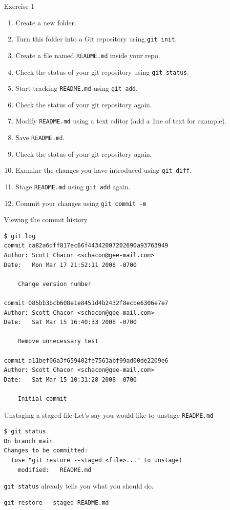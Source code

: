 \documentclass[handout]{beamer}
\begin{document}
\begin{frame}{Exercise 1}
	\begin{enumerate}
		\item Create a new folder.
		\item Turn this folder into a Git repository using \texttt{git init}.
		\item Create a file named \texttt{README.md} inside your repo.
		\item Check the status of your git repository using \texttt{git status}.
		\item Start tracking \texttt{README.md} using \texttt{git add}.
		\item Check the status of your git repository again.
		\item Modify \texttt{README.md} using a text editor (add a line of text for example).
		\item Save \texttt{README.md}.
		\item Check the status of your git repository again.
		\item Examine the changes you have introduced using \texttt{git diff}.
		\item Stage \texttt{README.md} using \texttt{git add} again. 
		\item Commit your changes using \texttt{git commit -m}
	\end{enumerate}
\end{frame}

\begin{frame}[fragile]{Viewing the commit history}
\begin{lstlisting}
$ git log
commit ca82a6dff817ec66f44342007202690a93763949
Author: Scott Chacon <schacon@gee-mail.com>
Date:   Mon Mar 17 21:52:11 2008 -0700

    Change version number

commit 085bb3bcb608e1e8451d4b2432f8ecbe6306e7e7
Author: Scott Chacon <schacon@gee-mail.com>
Date:   Sat Mar 15 16:40:33 2008 -0700

    Remove unnecessary test
    
commit a11bef06a3f659402fe7563abf99ad00de2209e6
Author: Scott Chacon <schacon@gee-mail.com>
Date:   Sat Mar 15 10:31:28 2008 -0700

    Initial commit
\end{lstlisting}
\end{frame}

\begin{frame}[fragile]{Unstaging a staged file}
Let's say you would like to unstage \texttt{README.md}
\begin{lstlisting}
$ git status
On branch main
Changes to be committed:
  (use "git restore --staged <file>..." to unstage)
	modified:   README.md
\end{lstlisting}
\texttt{git status} already tells you what you should do.
\begin{lstlisting}
git restore --staged README.md
\end{lstlisting}
\end{frame}
\end{document}
